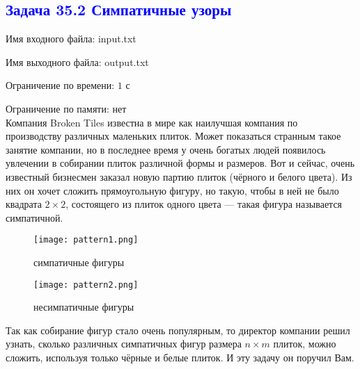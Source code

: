 \documentclass{article}
\begin{document}
\newpage
\setcounter{page}{1}
\begin{center}
    \textcolor{blue}{\section*{Задача 35.2 Симпатичные узоры}}
\end{center}

\par Имя входного файла: input.txt
\par Имя выходного файла: output.txt
\par Ограничение по времени: $1$ с
\par Ограничение по памяти: нет
\\

Компания Broken Tiles известна в мире как наилучшая компания по производству различных маленьких плиток. Может показаться странным такое занятие компании, но в последнее время у очень богатых людей появилось увлечении в собирании плиток различной формы и размеров. Вот и сейчас, очень известный бизнесмен заказал новую партию плиток (чёрного и белого цвета). Из них он хочет сложить прямоугольную фигуру, но такую, чтобы в ней не было квадрата $2 \times 2$, состоящего из плиток одного цвета — такая фигура называется симпатичной.

\begin{figure}[h]
    \begin{center}
        \begin{minipage}[h]{0.45\linewidth}
            \texttt{[image: pattern1.png]}
            \caption{\label{fig:pattern1} симпатичные фигуры}
            \label{fig:pattern1}
        \end{minipage}
        \hfill
        \begin{minipage}[h]{0.45\linewidth}
            \texttt{[image: pattern2.png]}
            \caption{\label{fig:pattern2} несимпатичные фигуры}
            \label{fig:pattern2}
        \end{minipage}
    \end{center}
\end{figure}

Так как собирание фигур стало очень популярным, то директор компании решил узнать, сколько различных симпатичных фигур размера $n \times m$ плиток, можно сложить, используя только чёрные и белые плиток. И эту задачу он поручил Вам.
\\
\end{document}
